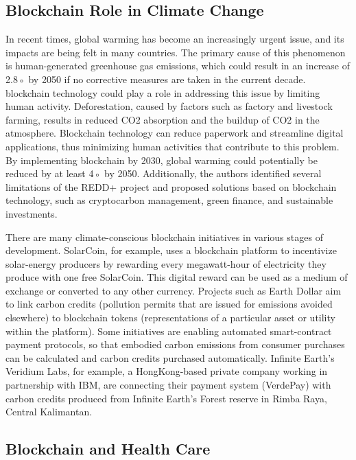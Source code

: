 \subsection{Blockchain Role in Climate Change }
In recent times, global warming has become an increasingly urgent issue, and its impacts are being felt in many countries. The primary cause of this phenomenon is human-generated greenhouse gas emissions, which could result in an increase of 2.8◦ by 2050 if no corrective measures are taken in the current decade. blockchain technology could play a role in addressing this issue by limiting human activity. Deforestation, caused by factors such as factory and livestock farming, results in reduced CO2 absorption and the buildup of CO2 in the atmosphere. Blockchain technology can reduce paperwork and streamline digital applications, thus minimizing human activities that contribute to this problem. By implementing blockchain by 2030, global warming could potentially be reduced by at least 4◦ by 2050. Additionally, the authors identified several limitations of the \ac{REDD+} project and proposed solutions based on blockchain technology, such as cryptocarbon management, green finance, and sustainable investments.

There are many climate-conscious blockchain initiatives in various stages of development. SolarCoin, for example, uses a blockchain platform to incentivize solar-energy producers by rewarding every megawatt-hour of electricity they produce with one free SolarCoin. This digital reward can be used as a medium of exchange or converted to any other currency. Projects such as Earth Dollar aim to link carbon credits (pollution permits that are issued for emissions avoided elsewhere) to blockchain tokens (representations of a particular asset or utility within the platform). Some initiatives are enabling automated smart-contract payment protocols, so that embodied carbon emissions from consumer purchases can be calculated and carbon credits purchased automatically. Infinite Earth’s Veridium Labs, for example, a HongKong-based private company working in partnership with IBM, are connecting their payment system (VerdePay) with carbon credits produced from Infinite Earth’s Forest reserve in Rimba Raya, Central Kalimantan.

\subsection{Blockchain and Health Care}

